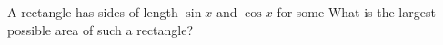 A rectangle has sides of length $\sin x$ and $\cos x$ for some   What is the largest possible area of such a rectangle?